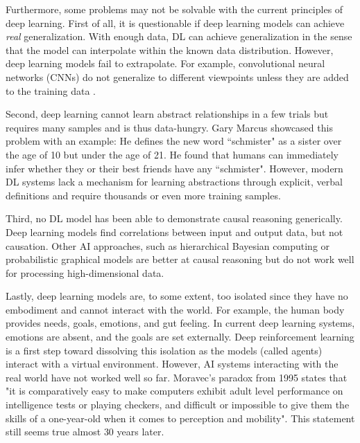 Furthermore, some problems may not be solvable with the current principles of deep learning.
First of all, it is questionable if deep learning models can achieve \emph{real} generalization.
With enough data, DL can achieve generalization in the sense that the model can interpolate within the known data distribution.
However, deep learning models fail to extrapolate.
For example, convolutional neural networks (CNNs) do not generalize to different viewpoints unless they are added to the training data .

Second, deep learning cannot learn abstract relationships in a few trials but requires many samples and is thus data-hungry.
Gary Marcus  showcased this problem with an example: He defines the new word ``schmister" as a sister over the age of 10 but under the age of 21. He found that humans can immediately infer whether they or their best friends have any ``schmister". However, modern DL systems lack a mechanism for learning abstractions through explicit, verbal definitions and require thousands or even more training samples.

Third, no DL model has been able to demonstrate causal reasoning generically.
Deep learning models find correlations between input and output data, but not causation.
Other AI approaches, such as hierarchical Bayesian computing or probabilistic graphical models are better at causal reasoning but do not work well for processing high-dimensional data.

Lastly, deep learning models are, to some extent, too isolated since they have no embodiment and cannot interact with the world.
For example, the human body provides needs, goals, emotions, and gut feeling.
In current deep learning systems, emotions are absent, and the goals are set externally.
Deep reinforcement learning is a first step toward dissolving this isolation as the models (called agents) interact with a virtual environment. 
However, AI systems interacting with the real world have not worked well so far.
Moravec's paradox from 1995  states that "it is comparatively easy to make computers exhibit adult level performance on intelligence tests or playing checkers, and difficult or impossible to give them the skills of a one-year-old when it comes to perception and mobility".
This statement still seems true almost $30$ years later.




